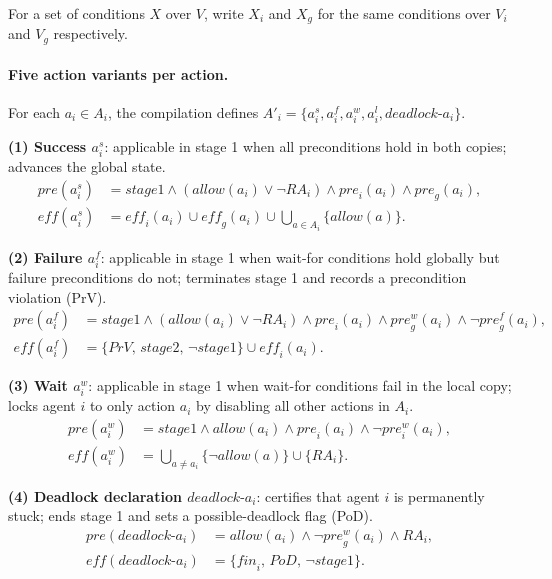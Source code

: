\documentclass{article}
\theoremstyle{definition}
\newcommand{\pre}{\mathit{pre}}
\newcommand{\pref}{\mathit{pre}^f}
\newcommand{\prew}{\mathit{pre}^w}
\newcommand{\eff}{\mathit{eff}}
\begin{document}
For a set of conditions $X$ over $V$, write $X_i$ and $X_g$ for the same conditions over $V_i$ and $V_g$ respectively.

\paragraph{Five action variants per action.}
For each $a_i \in A_i$, the compilation defines $A'_i = \{a_i^s, a_i^f, a_i^w, a_i^l, \mathit{deadlock}\text{-}a_i\}$.

\medskip
\noindent\textbf{(1) Success $a_i^s$}: applicable in stage 1 when all preconditions hold in both copies; advances the global state.
\begin{align*}
  \pre(a_i^s) &= \mathit{stage1} \wedge (\mathit{allow}(a_i) \vee \neg \mathit{RA}_i)
    \wedge \mathit{pre}_i(a_i) \wedge \mathit{pre}_g(a_i), \\
  \eff(a_i^s) &= \eff_i(a_i) \cup \eff_g(a_i) \cup \textstyle\bigcup_{a \in A_i} \{\mathit{allow}(a)\}.
\end{align*}

\medskip
\noindent\textbf{(2) Failure $a_i^f$}: applicable in stage 1 when wait-for conditions hold globally but failure preconditions do not; terminates stage 1 and records a precondition violation (PrV).
\begin{align*}
  \pre(a_i^f) &= \mathit{stage1} \wedge (\mathit{allow}(a_i) \vee \neg \mathit{RA}_i)
    \wedge \mathit{pre}_i(a_i) \wedge \prew_g(a_i) \wedge \neg \pref_g(a_i), \\
  \eff(a_i^f) &= \{\mathit{PrV},\, \mathit{stage2},\, \neg\mathit{stage1}\} \cup \eff_i(a_i).
\end{align*}

\medskip
\noindent\textbf{(3) Wait $a_i^w$}: applicable in stage 1 when wait-for conditions fail in the local copy; locks agent $i$ to only action $a_i$ by disabling all other actions in $A_i$.
\begin{align*}
  \pre(a_i^w) &= \mathit{stage1} \wedge \mathit{allow}(a_i) \wedge \mathit{pre}_i(a_i) \wedge \neg \prew_i(a_i), \\
  \eff(a_i^w) &= \textstyle\bigcup_{a \neq a_i} \{\neg\mathit{allow}(a)\} \cup \{\mathit{RA}_i\}.
\end{align*}

\medskip
\noindent\textbf{(4) Deadlock declaration $\mathit{deadlock}\text{-}a_i$}: certifies that agent $i$ is permanently stuck; ends stage 1 and sets a possible-deadlock flag (PoD).
\begin{align*}
  \pre(\mathit{deadlock}\text{-}a_i) &= \mathit{allow}(a_i) \wedge \neg \prew_g(a_i) \wedge \mathit{RA}_i, \\
  \eff(\mathit{deadlock}\text{-}a_i) &= \{\mathit{fin}_i,\, \mathit{PoD},\, \neg\mathit{stage1}\}.
\end{align*}
\end{document}
